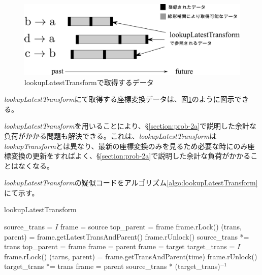\documentclass[a4paper]{jreport}	%
\begin{document}
\begin{figure}[h] 
\centering
\includegraphics[width=12cm]{lookupLatestTransform}
\caption{lookupLatestTransformで取得するデータ}
\label{fig:lookupLatestTransform}
\end{figure}

\textit{lookupLatestTransform}にて取得する座標変換データは、図\ref{fig:lookupLatestTransform}のように図示できる。

\textit{lookupLatestTransform}を用いることにより、§\ref{section:prob-2a}で説明した余計な負荷がかかる問題も解決できる。これは、\textit{lookupLatestTransform}は\textit{lookupTransform}とは異なり、最新の座標変換のみを見るため必要な時にのみ座標変換の更新をすればよく、§\ref{section:prob-2a}で説明した余計な負荷がかかることはなくなる。

\textit{lookupLatestTransform}の疑似コードをアルゴリズム\ref{algo:lookupLatestTransform}にて示す。

\begin{algorithm}
  \caption{lookupLatestTransform}\label{algo:lookupLatestTransform}
\begin{algorithmic}[1]
	\State source\_trans = $I$
	\State frame = source
	\State top\_parent = frame
	\State frame.rLock()
	\State (trans, parent) = frame.getLatestTransAndParent() 
	\State frame.rUnlock()
	\State source\_trans *= trans
	\State top\_parent = frame
	\State frame = parent
	\EndWhile
	\State frame = target
	\State target\_trans = $I$
	\State frame.rLock()
	\State (tarns, parent) = frame.getTransAndParent(time)
	\State frame.rUnlock()
	\State target\_trans *= trans
	\State frame = parent
	\EndWhile
	\State \Return source\_trans * (target\_trans)$^{-1}$
	\EndFunction
\end{algorithmic}
\end{algorithm}


\end{document}
